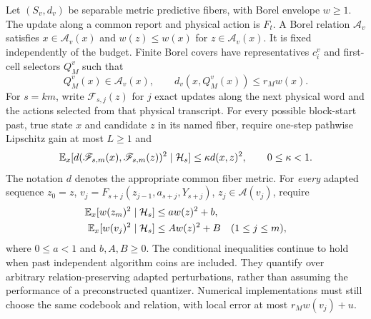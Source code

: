 Let $(S_v,d_v)$ be separable metric predictive fibers, with Borel envelope $w\ge1$. The update along a common report and physical action is $F_t$. A Borel relation $\mathcal A_v$ satisfies $x\in\mathcal A_v(x)$ and $w(z)\le w(x)$ for $z\in\mathcal A_v(x)$. It is fixed independently of the budget. Finite Borel covers have representatives $c_i^v$ and first-cell selectors $Q_M^v$ such that
\begin{equation}\label{eq:cover}
 Q_M^v(x)\in\mathcal A_v(x),\qquad
 d_v(x,Q_M^v(x))\le r_M w(x).
\end{equation}
For $s=km$, write $\mathscr F_{s,j}(z)$ for $j$ exact updates along the next physical word and the actions selected from that physical transcript. For every possible block-start past, true state $x$ and candidate $z$ in its named fiber, require one-step pathwise Lipschitz gain at most $L\ge1$ and
\begin{equation}\label{eq:pair}
 \mathbb E_x[d(\mathscr F_{s,m}(x),\mathscr F_{s,m}(z))^2\mid\mathcal H_s]
 \le\kappa d(x,z)^2,\qquad 0\le\kappa<1.
\end{equation}
The notation $d$ denotes the appropriate common fiber metric. For \emph{every} adapted sequence $z_0=z$, $v_j=F_{s+j}(z_{j-1},a_{s+j},Y_{s+j})$, $z_j\in\mathcal A(v_j)$, require
\begin{align}
 \mathbb E_x[w(z_m)^2\mid\mathcal H_s]&\le a w(z)^2+b,\label{eq:drift}\\
 \mathbb E_x[w(v_j)^2\mid\mathcal H_s]&\le A w(z)^2+B\quad(1\le j\le m),\label{eq:within}
\end{align}
where $0\le a<1$ and $b,A,B\ge0$. The conditional inequalities continue to hold when past independent algorithm coins are included. They quantify over arbitrary relation-preserving adapted perturbations, rather than assuming the performance of a preconstructed quantizer. Numerical implementations must still choose the same codebook and relation, with local error at most $r_Mw(v_j)+u$.

